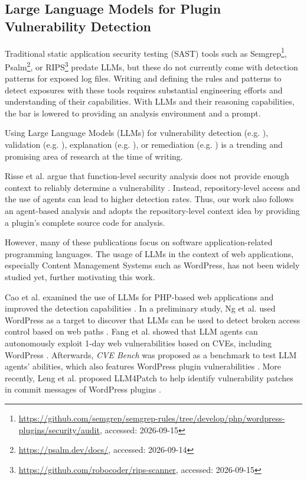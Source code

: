 \documentclass[sigconf]{acmart}
\begin{document}
\subsection{Large Language Models for Plugin Vulnerability Detection}
Traditional static application security testing (SAST) tools such as Semgrep\footnote{\url{https://github.com/semgrep/semgrep-rules/tree/develop/php/wordpress-plugins/security/audit}, accessed: 2026-09-15}, Psalm\footnote{\url{https://psalm.dev/docs/}, accessed: 2026-09-14}, or RIPS\footnote{\url{https://github.com/robocoder/rips-scanner}, accessed: 2026-09-15} predate LLMs, but these do not currently come with detection patterns for exposed log files. 
Writing and defining the rules and patterns to detect exposures with these tools requires substantial engineering efforts and understanding of their capabilities. With LLMs and their reasoning capabilities, the bar is lowered to providing an analysis environment and a prompt.

Using Large Language Models (LLMs) for vulnerability detection (e.g. \cite{LU2024112031,guo2024outside,du2024vul}), validation (e.g. \cite{li2026execution,ghosh2025cve,nitin2025faultline}), explanation (e.g. \cite{kumari2026vuln2action,germano2025study}), or remediation (e.g. \cite{kulsum2024case,11396517}) is a trending and promising area of research at the time of writing.

Risse et al. argue that function-level security analysis does not provide enough context  to reliably determine a vulnerability \cite{risse2025}. 
Instead, repository-level access \cite{repoaudit,benchmarking-vuln-dect-repos} and the use of agents \cite{react} can lead to higher detection rates. 
Thus, our work also follows an agent-based analysis and adopts the repository-level context idea by providing a plugin's complete source code for analysis.

However, many of these publications focus on software application-related programming languages.
The usage of LLMs in the context of web applications, especially Content Management Systems such as WordPress, has not been widely studied yet, further motivating this work.

Cao et al. examined the use of LLMs for PHP-based web applications and improved the detection capabilities \cite{cao2024realvul}.
In a preliminary study, Ng et al. used WordPress as a target to discover that LLMs can be used to detect broken access control based on web paths \cite{10902771}.
Fang et al. showed that LLM agents can autonomously exploit 1-day web vulnerabilities based on CVEs, including WordPress \cite{fang2024llmagentsautonomouslyexploit}.
Afterwards, \emph{CVE Bench} was proposed as a benchmark to test LLM agents' abilities, which also features WordPress plugin vulnerabilities \cite{zhu2025cve}.
More recently, Leng et al. proposed LLM4Patch to help identify vulnerability patches in commit messages of WordPress plugins \cite{leng2025poster}.
\end{document}
